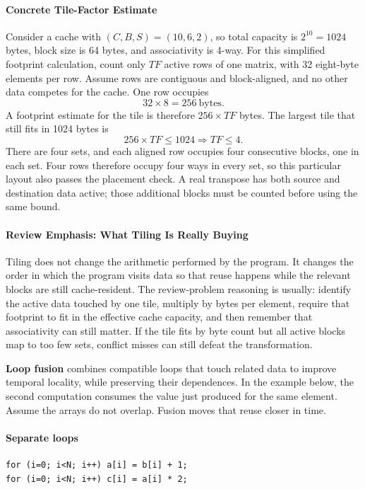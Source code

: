 \paragraph{Concrete Tile-Factor Estimate}\label{par:auto-075b}
Consider a cache with $(C,B,S)=(10,6,2)$, so total capacity is $2^{10}=1024$ bytes, block size is 64 bytes, and associativity is 4-way.
For this simplified footprint calculation, count only $TF$ active rows of one matrix, with 32 eight-byte elements per row.
Assume rows are contiguous and block-aligned, and no other data competes for the cache.
One row occupies
\begin{equation}\label{eq:auto-089b}
    32 \times 8 = 256\ \text{bytes}.
\end{equation}
A footprint estimate for the tile is therefore $256 \times TF$ bytes.
The largest tile that still fits in 1024 bytes is
\begin{equation}\label{eq:auto-089c}
    256 \times TF \le 1024 \Rightarrow TF \le 4.
\end{equation}
There are four sets, and each aligned row occupies four consecutive blocks, one in each set.
Four rows therefore occupy four ways in every set, so this particular layout also passes the placement check.
A real transpose has both source and destination data active; those additional blocks must be counted before using the same bound.

\paragraph{Review Emphasis: What Tiling Is Really Buying}\label{par:ch3-review-tiling}
Tiling does not change the arithmetic performed by the program.
It changes the order in which the program visits data so that reuse happens while the relevant blocks are still cache-resident.
The review-problem reasoning is usually: identify the active data touched by one tile, multiply by bytes per element, require that footprint to fit in the effective cache capacity, and then remember that associativity can still matter.
If the tile fits by byte count but all active blocks map to too few sets, conflict misses can still defeat the transformation.

\textbf{Loop fusion} combines compatible loops that touch related data to improve temporal locality, while preserving their dependences.
In the example below, the second computation consumes the value just produced for the same element.
Assume the arrays do not overlap.
Fusion moves that reuse closer in time.
\paragraph{Separate loops}
\begin{verbatim}
for (i=0; i<N; i++) a[i] = b[i] + 1;
for (i=0; i<N; i++) c[i] = a[i] * 2;
\end{verbatim}
